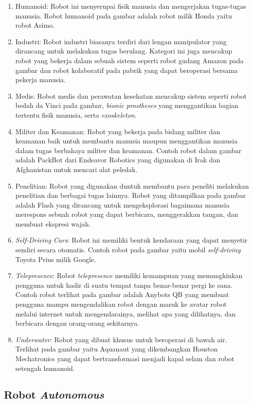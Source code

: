 \begin{enumerate}[label=(\alph*)]
    \item Humanoid: Robot ini menyerupai fisik manusia dan mengerjakan tugas-tugas manusia. Robot humanoid pada gambar adalah robot milik Honda yaitu robot Asimo.
    \item Industri: Robot industri biasanya terdiri dari lengan manipulator yang dirancang untuk melakukan tugas berulang. Kategori ini juga mencakup robot yang bekerja dalam sebuah sistem seperti robot gudang Amazon pada gambar dan robot kolaboratif pada pabrik yang dapat beroperasi bersama pekerja manusia.
    \item Medis: Robot medis dan perawatan kesehatan mencakup sistem seperti robot bedah da Vinci pada gambar, \textit{bionic prostheses} yang menggantikan bagian tertentu fisik manusia, serta \textit{exoskeleton}.
    \item Militer dan Keamanan: Robot yang bekerja pada bidang militer dan keamanan baik untuk membantu manusia maupun menggantikan manusia dalam tugas berbahaya militer dan keamanan. Contoh robot dalam gambar adalah  PackBot dari Endeavor Robotics yang digunakan di Irak dan Afghanistan untuk mencari alat peledak.
    \item Penelitian: Robot yang digunakan duntuk membantu para peneliti melakukan penelitian dan berbagai tugas lainnya. Robot yang ditampilkan pada gambar adalah Flash yang dirancang untuk mengeksplorasi bagaimana manusia merespons sebuah robot yang dapat berbicara, menggerakkan tangan, dan membuat ekspresi wajah.
    \item \textit{Self-Driving Cars}: Robot ini memiliki bentuk kendaraan yang dapat menyetir sendiri secara otomatis. Contoh robot pada gambar yaitu mobil \textit{self-driving} Toyota Prius milik Google. 
    \item \textit{Telepresence}: Robot \textit{telepresence} memiliki kemampuan yang memungkinkan pengguna untuk hadir di suatu tempat tanpa benar-benar pergi ke sana. Contoh robot terlihat pada gambar adalah Anybots QB yang membuat pengguna mampu mengendalikan robot dengan masuk ke avatar robot melalui internet untuk mengendarainya, melihat apa yang dilihatnya, dan berbicara dengan orang-orang sekitarnya.
    \item \textit{Underwater}: Robot yang dibuat khusus untuk beroperasi di bawah air. Terlihat pada gambar yaitu Aquanaut yang dikembangkan Houston Mechatronics yang dapat bertransformasi menjadi kapal selam dan robot setengah humanoid.
\end{enumerate}


\subsection{Robot \textit{Autonomous}}
\label{sec:Robot_Autonomous} 
    
